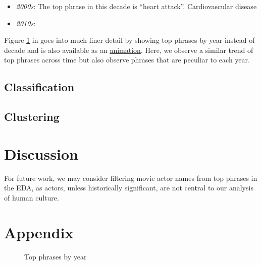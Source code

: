 \documentclass{article}
\begin{document}
\begin{multicols}{2}
\begin{itemize}
    \item \textit{2000s}: The top phrase in this decade is ``heart attack''. Cardiovascular disease 
    \item \textit{2010s}:
\end{itemize}

Figure \ref{figure:top_phrases_by_year} in  goes into much finer detail by showing top phrases by year instead of decade and is also available as an \href{https://www.youtube.com/watch?v=8aOob6iJO5Y}{animation}. Here, we observe a similar trend of top phrases across time but also observe phrases that are peculiar to each year.

\subsection{Classification}
\subsection{Clustering}

\section{Discussion} %
For future work, we may consider filtering movie actor names from top phrases in the EDA, as actors, unless historically significant, are not central to our analysis of human culture.

\nocite{10.1145/2723372.2751523}


\section{Appendix} \label{appendix} %
\begin{figure}
\caption{Top phrases by year}
\centering
{}
\label{figure:top_phrases_by_year}
\end{figure}

\begin{figure}
\ContinuedFloat
\centering
{}
\end{figure}
\end{multicols}
\end{document}
